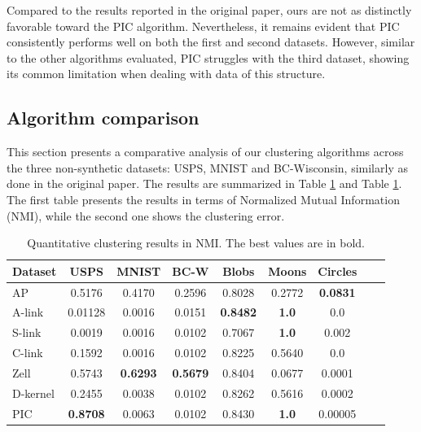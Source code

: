 \documentclass[
	10pt,
	parskip=half-,	
	paper=a4,
	english
	]{scrartcl}
\begin{document}
Compared to the results reported in the original paper, ours are not as distinctly favorable toward the PIC algorithm. Nevertheless, it remains evident that PIC consistently performs well on both the first and second datasets. However, similar to the other algorithms evaluated, PIC struggles with the third dataset, showing its common limitation when dealing with data of this structure.

\subsection{Algorithm comparison}

This section presents a comparative analysis of our clustering algorithms across the three non-synthetic datasets: USPS, MNIST and BC-Wisconsin, similarly as done in the original paper. The results are summarized in Table \ref{tab:synthetic_results} and Table \ref{tab:synthetic_results}. The first table presents the results in terms of Normalized Mutual Information (NMI), while the second one shows the clustering error.

\begin{table}[h]
    \centering
    \caption{Quantitative clustering results in NMI. The best values are in bold.}
    \begin{tabular}{lcccccccc}
    \toprule
    \textbf{Dataset} & \textbf{USPS} & \textbf{MNIST} & \textbf{BC-W} & \textbf{Blobs} & \textbf{Moons} & \textbf{Circles} \\
    \midrule
    AP       & 0.5176   & 0.4170 & 0.2596 & 0.8028  & 0.2772 & \textbf{0.0831} \\
    A-link   & 0.01128  & 0.0016 & 0.0151 & \textbf{0.8482}  & \textbf{1.0} & 0.0 \\
    S-link   & 0.0019   & 0.0016 & 0.0102 & 0.7067  & \textbf{1.0} & 0.002 \\
    C-link   & 0.1592   & 0.0016 & 0.0102 & 0.8225  & 0.5640 & 0.0 \\
    Zell     & 0.5743   & \textbf{0.6293} & \textbf{0.5679} & 0.8404   & 0.0677 & 0.0001 \\
    D-kernel & 0.2455   & 0.0038 & 0.0102 & 0.8262   & 0.5616 & 0.0002 \\
    PIC & \textbf{0.8708} & 0.0063 & 0.0102 & 0.8430   & \textbf{1.0} & 0.00005 \\
    \bottomrule
    \end{tabular}
    \label{tab:synthetic_results}
\end{table}
\end{document}
